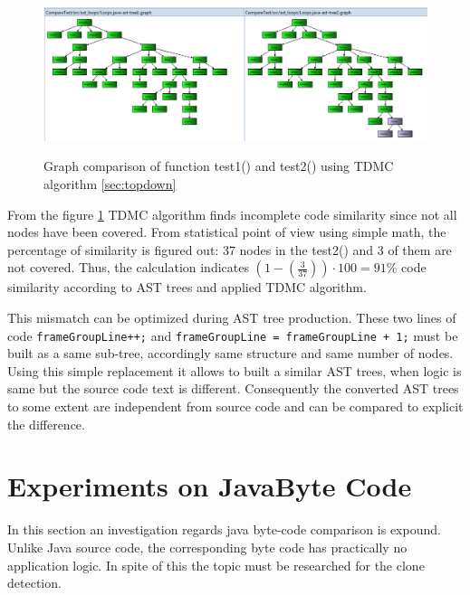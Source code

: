 \documentclass{report}
\begin{document}
\begin{figure}[h]
  \centering
  \includegraphics[width=1.00\textwidth]{Figures/AST-optimization/tree-compared1}\\[0.1cm]
  \caption[Graph comparison on similar AST trees]{Graph comparison of function test1() and test2() using TDMC algorithm \ref{sec:topdown}}
  \label{fig:ast-graph-compare-similar-tdmc}
\end{figure}

From the figure \ref{fig:ast-graph-compare-similar-tdmc} TDMC algorithm finds incomplete code similarity since not all nodes have been covered. From statistical point of view using simple math, the percentage of similarity is figured out: 37 nodes in the test2() and 3 of them are not covered. Thus, the calculation indicates  $\left ( 1 - \left (\frac{3}{37} \right ) \right )\cdot 100 = 91\%$ code similarity according to AST trees and applied TDMC algorithm.

This mismatch can be optimized during AST tree production. These two lines of code \texttt{frameGroupLine++;} and \texttt{frameGroupLine = frameGroupLine + 1;}
must be built as a same sub-tree, accordingly same structure and same number of nodes. Using this simple replacement it allows to built a similar AST trees, when logic is same but the source code text is different. Consequently the converted AST trees to some extent are independent from source code and can be compared to explicit the difference.

\section{Experiments on JavaByte Code}
\label{sec: java-code-experiments}

In this section an investigation regards java byte-code comparison is expound. Unlike Java source code, the corresponding byte code has practically no application logic. In spite of this the topic must be researched for the clone detection.
\end{document}
